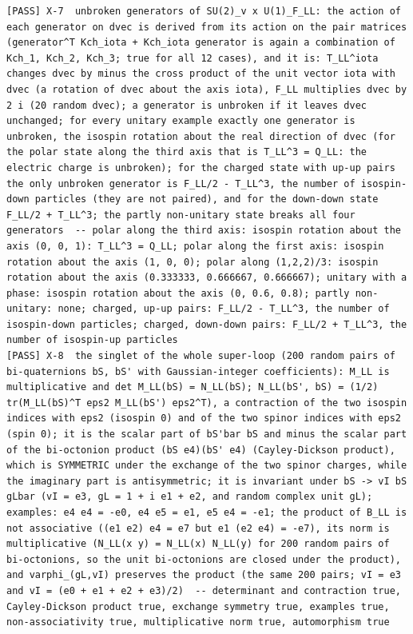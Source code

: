 \documentclass[
  10pt,
]{article}
\begin{document}
\begin{verbatim}
[PASS] X-7  unbroken generators of SU(2)_v x U(1)_F_LL: the action of each generator on dvec is derived from its action on the pair matrices (generator^T Kch_iota + Kch_iota generator is again a combination of Kch_1, Kch_2, Kch_3; true for all 12 cases), and it is: T_LL^iota changes dvec by minus the cross product of the unit vector iota with dvec (a rotation of dvec about the axis iota), F_LL multiplies dvec by 2 i (20 random dvec); a generator is unbroken if it leaves dvec unchanged; for every unitary example exactly one generator is unbroken, the isospin rotation about the real direction of dvec (for the polar state along the third axis that is T_LL^3 = Q_LL: the electric charge is unbroken); for the charged state with up-up pairs the only unbroken generator is F_LL/2 - T_LL^3, the number of isospin-down particles (they are not paired), and for the down-down state F_LL/2 + T_LL^3; the partly non-unitary state breaks all four generators  -- polar along the third axis: isospin rotation about the axis (0, 0, 1): T_LL^3 = Q_LL; polar along the first axis: isospin rotation about the axis (1, 0, 0); polar along (1,2,2)/3: isospin rotation about the axis (0.333333, 0.666667, 0.666667); unitary with a phase: isospin rotation about the axis (0, 0.6, 0.8); partly non-unitary: none; charged, up-up pairs: F_LL/2 - T_LL^3, the number of isospin-down particles; charged, down-down pairs: F_LL/2 + T_LL^3, the number of isospin-up particles
[PASS] X-8  the singlet of the whole super-loop (200 random pairs of bi-quaternions bS, bS' with Gaussian-integer coefficients): M_LL is multiplicative and det M_LL(bS) = N_LL(bS); N_LL(bS', bS) = (1/2) tr(M_LL(bS)^T eps2 M_LL(bS') eps2^T), a contraction of the two isospin indices with eps2 (isospin 0) and of the two spinor indices with eps2 (spin 0); it is the scalar part of bS'bar bS and minus the scalar part of the bi-octonion product (bS e4)(bS' e4) (Cayley-Dickson product), which is SYMMETRIC under the exchange of the two spinor charges, while the imaginary part is antisymmetric; it is invariant under bS -> vI bS gLbar (vI = e3, gL = 1 + i e1 + e2, and random complex unit gL); examples: e4 e4 = -e0, e4 e5 = e1, e5 e4 = -e1; the product of B_LL is not associative ((e1 e2) e4 = e7 but e1 (e2 e4) = -e7), its norm is multiplicative (N_LL(x y) = N_LL(x) N_LL(y) for 200 random pairs of bi-octonions, so the unit bi-octonions are closed under the product), and varphi_(gL,vI) preserves the product (the same 200 pairs; vI = e3 and vI = (e0 + e1 + e2 + e3)/2)  -- determinant and contraction true, Cayley-Dickson product true, exchange symmetry true, examples true, non-associativity true, multiplicative norm true, automorphism true

\end{verbatim}
\end{document}
